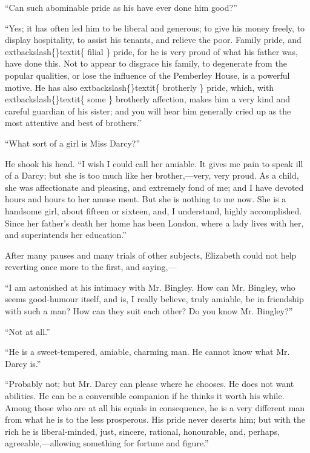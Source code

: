 \documentclass[10pt]{book}
\begin{document}
   “Can such abominable pride as his have ever done him good?”
  

   “Yes; it has often led him to be liberal and generous; to give his money
freely, to display hospitality, to assist his tenants, and relieve the
poor. Family pride, and
   	extbackslash\{\}textit\{
    filial
   \}
   pride, for he is very proud of what his
father was, have done this. Not to appear to disgrace his family, to
degenerate from the popular qualities, or lose the influence of the
Pemberley House, is a powerful motive. He has also
   	extbackslash\{\}textit\{
    brotherly
   \}
   pride,
which, with
   	extbackslash\{\}textit\{
    some
   \}
   brotherly affection, makes him a very kind and
careful guardian of his sister; and you will hear him generally cried up
as the most attentive and best of brothers.”
  

   “What sort of a girl is Miss Darcy?”
  

   He shook his head. “I wish I could call her amiable. It gives me pain to
speak ill of a Darcy; but she is too much like her brother,—very, very
proud. As a child, she was affectionate and pleasing, and extremely fond
of me; and I have devoted hours and hours to her amuse
   ment. But she is
nothing to me now. She is a handsome girl, about fifteen or sixteen,
and, I understand, highly accomplished. Since her father’s death her
home has been London, where a lady lives with her, and superintends her
education.”
  

   After many pauses and many trials of other subjects, Elizabeth could not
help reverting once more to the first, and saying,—
  

   “I am astonished at his intimacy with Mr. Bingley. How can Mr. Bingley,
who seems good-humour itself, and is, I really believe, truly amiable,
be in friendship with such a man? How can they suit each other? Do you
know Mr. Bingley?”
  

   “Not at all.”
  

   “He is a sweet-tempered, amiable, charming man. He cannot know what Mr.
Darcy is.”
  

   “Probably not; but Mr. Darcy can please where he chooses. He does not
want abilities. He can be a conversible companion if he thinks it worth
his while. Among those who are at all his equals in consequence, he is a
very different man from what he is to the less prosperous. His pride
never deserts him; but with the rich he is liberal-minded, just,
sincere, rational, honourable, and, perhaps, agreeable,—allowing
something for fortune and figure.”
  
\end{document}
